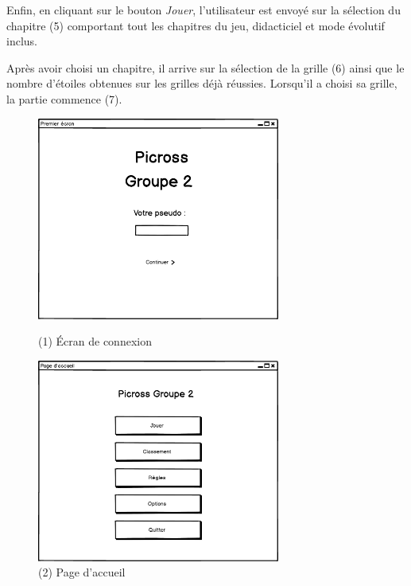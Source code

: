 \documentclass{report}
\begin{document}
      		Enfin, en cliquant sur le bouton \textit{Jouer}, l'utilisateur est envoyé sur la sélection du  chapitre (5) comportant tout les chapitres du jeu, didacticiel et mode évolutif inclus. 
      		
      		Après avoir choisi un chapitre, il arrive sur la sélection de la grille (6) ainsi que le nombre d'étoiles obtenues sur les grilles déjà réussies. Lorsqu'il a choisi sa grille, la partie commence (7).
		
		
	\begin{figure}[H]
    		\begin{minipage}[c]{.46\linewidth}
       			\centering
       			\includegraphics[width=8cm]{Maquettes/Premier_ecran.png}
        			\caption{(1) Écran de connexion}
    		\end{minipage}
    		\hfill
   		\begin{minipage}[c]{.46\linewidth}
        			\centering
       			 \includegraphics[width=8cm]{Maquettes/Page_Accueil.png}
        			\caption{(2) Page d'accueil}
    		\end{minipage}
	\end{figure}
	
\end{document}
